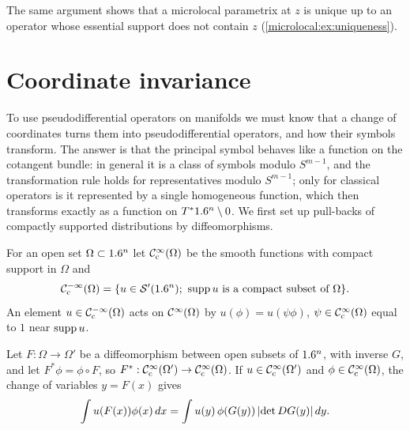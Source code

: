 The same argument shows that a microlocal parametrix at $z$ is unique up to
an operator whose essential support does not contain $z$
(\cref{microlocal:ex:uniqueness}).

\section{Coordinate invariance}\label{microlocal:sec:coordinates}

To use pseudodifferential operators on manifolds we must know that a change
of coordinates turns them into pseudodifferential operators, and how their
symbols transform. The answer is that the principal symbol behaves like a
function on the cotangent bundle: in general it is a class of symbols modulo
$S^{m-1}$, and the transformation rule holds for representatives modulo
$S^{m-1}$; only for classical operators is it represented by a single
homogeneous function, which then transforms exactly as a function on
$T^*1.6^n\setminus0$. We first set up pull-backs of compactly
supported distributions by diffeomorphisms.

For an open set $\Omega\subset1.6^n$ let $\mathcal{C}^\infty_{\mathrm{c}}(\Omega)$ be the smooth functions
with compact support in $\Omega$ and
\begin{equation*}
  \mathcal{C}^{-\infty}_{\mathrm{c}}(\Omega)=\{u\in\mathcal{S}'(1.6^n);\ \operatorname{supp} u\text{ is a compact subset of }\Omega\}.
\end{equation*}
An element $u\in\mathcal{C}^{-\infty}_{\mathrm{c}}(\Omega)$ acts on $\mathcal{C}^\infty(\Omega)$ by $u(\phi)=u(\psi\phi)$,
$\psi\in\mathcal{C}^\infty_{\mathrm{c}}(\Omega)$ equal to $1$ near $\operatorname{supp} u$.

Let $F:\Omega\to\Omega'$ be a diffeomorphism between open subsets of $1.6^n$,
with inverse $G$, and let $F^*\phi=\phi\circ F$, so
$F^*:\mathcal{C}^\infty_{\mathrm{c}}(\Omega')\to\mathcal{C}^\infty_{\mathrm{c}}(\Omega)$. If $u\in\mathcal{C}^\infty_{\mathrm{c}}(\Omega')$ and
$\phi\in\mathcal{C}^\infty_{\mathrm{c}}(\Omega)$, the change of variables $y=F(x)$ gives
\begin{equation}\label{microlocal:eq:pullback-change}
  \int u(F(x))\phi(x)\,dx=\int u(y)\,\phi(G(y))\,\lvert \det DG(y)\rvert\,dy .
\end{equation}


